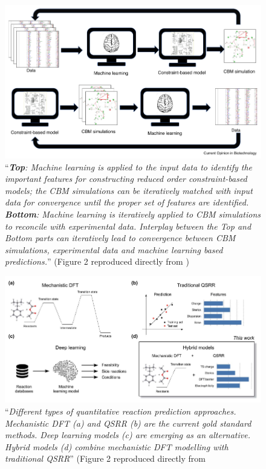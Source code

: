 \documentclass[10pt,aspectratio=169]{beamer}
\newcounter{frame}[frame]
\begin{document}
\begin{frame}{}
    \begin{figure}
        \centering
        \includegraphics[width=.8\linewidth]{fig/Rana et al (Current Opinion in Biotechnology, 2020)-fig1.pdf}
        \caption{\footnotesize ``\textit{\textbf{Top}: Machine learning is applied to the input data to identify the important features for constructing reduced order constraint-based models; the CBM simulations can be iteratively matched with input data for convergence until the proper set of features are identified. \textbf{Bottom}: Machine learning is iteratively applied to CBM simulations to reconcile with experimental data. Interplay between the Top and Bottom parts can iteratively lead to convergence between CBM simulations, experimental data and machine learning based predictions.}'' (Figure 2 reproduced directly from \textcite{ranaRecentAdvancesConstraintbased2020})}
        \label{fig:rana}
    \end{figure}
\end{frame}

\begin{frame}
    \begin{figure}
        \centering
        \includegraphics[width=1\linewidth]{Jorner et al (Chemical Science, 2021)-fig2.pdf}
        \caption{``\textit{Different types of quantitative reaction prediction approaches. Mechanistic DFT (a) and QSRR (b) are the current gold standard methods. Deep learning models (c) are emerging as an alternative. Hybrid models (d) combine mechanistic DFT modelling with traditional QSRR}'' (Figure 2 reproduced directly from \textcite{jornerMachineLearningMeets2021}}
        \label{fig:jorner}
    \end{figure}
\end{frame}
\end{document}
